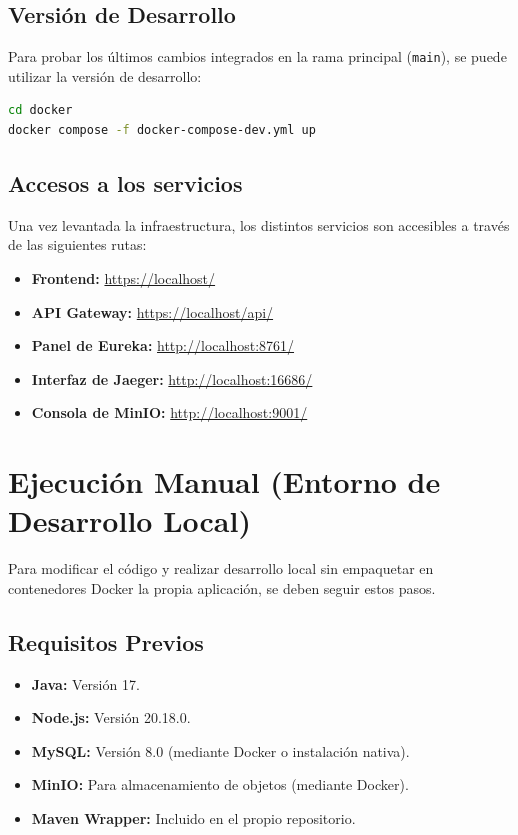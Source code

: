 \subsection{Versión de Desarrollo}
Para probar los últimos cambios integrados en la rama principal (\texttt{main}), se puede utilizar la versión de desarrollo:
\begin{lstlisting}[language=bash]
cd docker
docker compose -f docker-compose-dev.yml up
\end{lstlisting}

\subsection{Accesos a los servicios}
Una vez levantada la infraestructura, los distintos servicios son accesibles a través de las siguientes rutas:
\begin{itemize}
    \item \textbf{Frontend:} \url{https://localhost/}
    \item \textbf{API Gateway:} \url{https://localhost/api/}
    \item \textbf{Panel de Eureka:} \url{http://localhost:8761/}
    \item \textbf{Interfaz de Jaeger:} \url{http://localhost:16686/}
    \item \textbf{Consola de MinIO:} \url{http://localhost:9001/}
\end{itemize}

\section{Ejecución Manual (Entorno de Desarrollo Local)}
Para modificar el código y realizar desarrollo local sin empaquetar en contenedores Docker la propia aplicación, se deben seguir estos pasos.

\subsection{Requisitos Previos}
\begin{itemize}
    \item \textbf{Java:} Versión 17.
    \item \textbf{Node.js:} Versión 20.18.0.
    \item \textbf{MySQL:} Versión 8.0 (mediante Docker o instalación nativa).
    \item \textbf{MinIO:} Para almacenamiento de objetos (mediante Docker).
    \item \textbf{Maven Wrapper:} Incluido en el propio repositorio.
\end{itemize}


